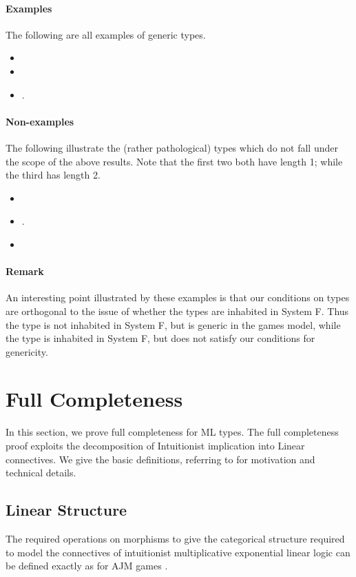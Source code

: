 \documentclass[a4paper,11pt]{article}
\begin{document}
\paragraph{Examples}
The following are all examples of generic types.
\begin{itemize}
\item 
\item 
\item .
\end{itemize}

\paragraph{Non-examples}
The following illustrate the (rather pathological) types which do not
fall under the scope of the above results. Note that the
first two both have length 1; while the third has length 2.
\begin{itemize}
\item 
\item .
\item 
\end{itemize}

\paragraph{Remark} An interesting point illustrated by these examples is that our
conditions on types are orthogonal to the issue of whether the types
are inhabited in System F. Thus the type  is not inhabited in System F, but is generic in the
games model, while the type  is inhabited in System F, but does not satisfy our
conditions for genericity.




\section{Full Completeness}


In this section, we prove full completeness for ML types.  The
full completeness proof exploits the decomposition of Intuitionist
implication into Linear connectives.  We give the basic
definitions, referring to \cite{AJM00} for motivation and
technical details.



\subsection{Linear Structure} The required operations on
morphisms to give the categorical structure required to model the
connectives of intuitionist multiplicative exponential linear
logic can be defined exactly as for AJM games \cite{AJM00}.
\end{document}
